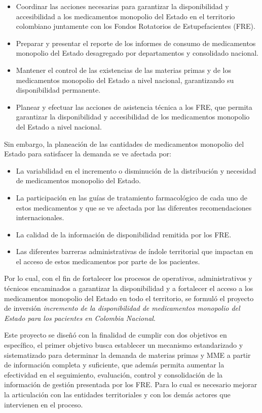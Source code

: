 \documentclass[
  oneside]{book}
\begin{document}
\begin{itemize}
\item
  Coordinar las acciones necesarias para garantizar la disponibilidad y accesibilidad a los medicamentos monopolio del Estado en el territorio colombiano juntamente con los Fondos Rotatorios de Estupefacientes (FRE).
\item
  Preparar y presentar el reporte de los informes de consumo de medicamentos monopolio del Estado desagregado por departamentos y consolidado nacional.
\item
  Mantener el control de las existencias de las materias primas y de los medicamentos monopolio del Estado a nivel nacional, garantizando su disponibilidad permanente.
\item
  Planear y efectuar las acciones de asistencia técnica a los FRE, que permita garantizar la disponibilidad y accesibilidad de los medicamentos monopolio del Estado a nivel nacional.
\end{itemize}

Sin embargo, la planeación de las cantidades de medicamentos monopolio del Estado para satisfacer la demanda se ve afectada por:

\begin{itemize}
\item
  La variabilidad en el incremento o disminución de la distribución y necesidad de medicamentos monopolio del Estado.
\item
  La participación en las guías de tratamiento farmacológico de cada uno de estos medicamentos y que se ve afectada por las diferentes recomendaciones internacionales.
\item
  La calidad de la información de disponibilidad remitida por los FRE.
\item
  Las diferentes barreras administrativas de índole territorial que impactan en el acceso de estos medicamentos por parte de los pacientes.
\end{itemize}

Por lo cual, con el fin de fortalecer los procesos de operativos, administrativos y técnicos encaminados a garantizar la disponibilidad y a fortalecer el acceso a los medicamentos monopolio del Estado en todo el territorio, se formuló el proyecto de inversión \emph{incremento de la disponibilidad de medicamentos monopolio del Estado para los pacientes en Colombia Nacional}.

Este proyecto se diseñó con la finalidad de cumplir con dos objetivos en específico, el primer objetivo busca establecer un mecanismo estandarizado y sistematizado para determinar la demanda de materias primas y MME a partir de información completa y suficiente, que además permita aumentar la efectividad en el seguimiento, evaluación, control y consolidación de la información de gestión presentada por los FRE. Para lo cual es necesario mejorar la articulación con las entidades territoriales y con los demás actores que intervienen en el proceso.
\end{document}

